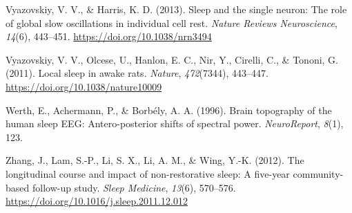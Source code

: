 \documentclass[
]{article}
\newlength{\cslhangindent}
\newenvironment{CSLReferences}[2] %
 {\begin{list}{}{%
  \setlength{\itemindent}{0pt}
  \setlength{\leftmargin}{0pt}
  \setlength{\parsep}{0pt}
  \ifodd #1
   \setlength{\leftmargin}{\cslhangindent}
   \setlength{\itemindent}{-1\cslhangindent}
  \fi
  \setlength{\itemsep}{#2\baselineskip}}}
 {\end{list}}
\begin{document}
\begin{CSLReferences}{1}{0}
Vyazovskiy, V. V., \& Harris, K. D. (2013). Sleep and the single neuron:
{The} role of global slow oscillations in individual cell rest.
\emph{Nature Reviews Neuroscience}, \emph{14}(6), 443--451.
\url{https://doi.org/10.1038/nrn3494}

Vyazovskiy, V. V., Olcese, U., Hanlon, E. C., Nir, Y., Cirelli, C., \&
Tononi, G. (2011). Local sleep in awake rats. \emph{Nature},
\emph{472}(7344), 443--447. \url{https://doi.org/10.1038/nature10009}

Werth, E., Achermann, P., \& Borbély, A. A. (1996). Brain topography of
the human sleep {EEG}: Antero-posterior shifts of spectral power.
\emph{NeuroReport}, \emph{8}(1), 123.

Zhang, J., Lam, S.-P., Li, S. X., Li, A. M., \& Wing, Y.-K. (2012). The
longitudinal course and impact of non-restorative sleep: {A} five-year
community-based follow-up study. \emph{Sleep Medicine}, \emph{13}(6),
570--576. \url{https://doi.org/10.1016/j.sleep.2011.12.012}

\end{CSLReferences}
\end{document}
